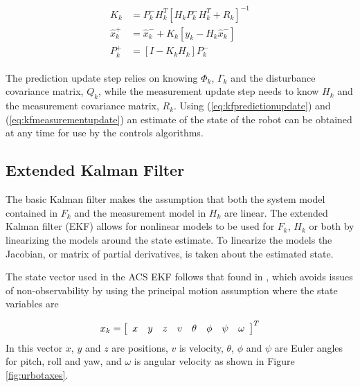 \begin{align}
\label{eq:kfmeasurementupdate}
\begin{split}
K_k &= P_k^-H_k^T\left[H_kP_k^-H_k^T + R_k\right]^{-1} \\
\hat{x}_k^+ &= \hat{x}_k^- + K_k\left[y_k - H_k\hat{x}_k^-\right] \\
P_k^+ &= \left[I - K_kH_k\right]P_k^-
\end{split}
\end{align}

The prediction update step relies on knowing $\Phi_k$, $\Gamma_k$ and the disturbance covariance matrix, $Q_k$, while the measurement update step needs to know $H_k$ and the measurement covariance matrix, $R_k$. Using (\ref{eq:kfpredictionupdate}) and (\ref{eq:kfmeasurementupdate}) an estimate of the state of the robot can be obtained at any time for use by the controls algorithms.

\subsection{Extended Kalman Filter}
\label{sec:extendedkf}
The basic Kalman filter makes the assumption that both the system model contained in $F_k$ and the measurement model in $H_k$ are linear. The extended Kalman filter (EKF) allows for nonlinear models to be used for $F_k$, $H_k$ or both by linearizing the models around the state estimate. To linearize the models the Jacobian, or matrix of partial derivatives, is taken about the estimated state.

The state vector used in the ACS EKF follows that found in \cite{Kelly_1994_338}, \cite{Kelly_1994_333} which avoids issues of non-observability by using the principal motion assumption where the state variables are

\begin{align*}
x_k = \left[\begin{array}{c c c c c c c c} x & y & z & v & \theta & \phi & \psi & \omega \end{array}\right]^T
\end{align*}
In this vector $x$, $y$ and $z$ are positions, $v$ is velocity, $\theta$, $\phi$ and $\psi$ are Euler angles for pitch, roll and yaw, and $\omega$ is angular velocity as shown in Figure \ref{fig:urbotaxes}.

